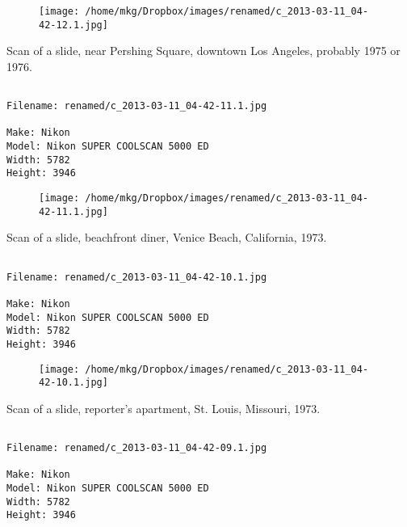 \begin{figure}
\texttt{[image: /home/mkg/Dropbox/images/renamed/c\_2013-03-11\_04-42-12.1.jpg]}
\end{figure}
    
\clearpage
\onecolumn
\noindent Scan of a slide, near Pershing Square, downtown Los Angeles, probably 1975 or 1976.
\noindent
\begin{lstlisting}

Filename: renamed/c_2013-03-11_04-42-11.1.jpg

Make: Nikon
Model: Nikon SUPER COOLSCAN 5000 ED
Width: 5782
Height: 3946
\end{lstlisting}
\clearpage

\begin{figure}
\texttt{[image: /home/mkg/Dropbox/images/renamed/c\_2013-03-11\_04-42-11.1.jpg]}
\end{figure}
    
\clearpage
\onecolumn
\noindent Scan of a slide, beachfront diner, Venice Beach, California, 1973.
\noindent
\begin{lstlisting}

Filename: renamed/c_2013-03-11_04-42-10.1.jpg

Make: Nikon
Model: Nikon SUPER COOLSCAN 5000 ED
Width: 5782
Height: 3946
\end{lstlisting}
\clearpage

\begin{figure}
\texttt{[image: /home/mkg/Dropbox/images/renamed/c\_2013-03-11\_04-42-10.1.jpg]}
\end{figure}
    
\clearpage
\onecolumn
\noindent Scan of a slide, reporter's apartment, St. Louis, Missouri, 1973.
\noindent
\begin{lstlisting}

Filename: renamed/c_2013-03-11_04-42-09.1.jpg

Make: Nikon
Model: Nikon SUPER COOLSCAN 5000 ED
Width: 5782
Height: 3946
\end{lstlisting}
\clearpage

